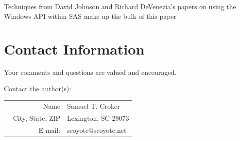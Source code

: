 \documentclass{sugconf}
\begin{document}
Techniques from David Johnson and Richard DeVenezia's papers on using the Windows API within SAS make up the bulk of this paper  

\section{Contact Information}
Your comments and questions are valued and encouraged.

Contact the author(s):
\begin{tabular}[t]{rl}%
Name               & Samuel T. Croker                \\\
City, State, ZIP   & Lexington, SC 29073               \\
E-mail:            & scoyote@scoyote.net        \\
\end{tabular}

\SASisRegisteredTrademark%
\OtherTrademarks%
\end{document}
